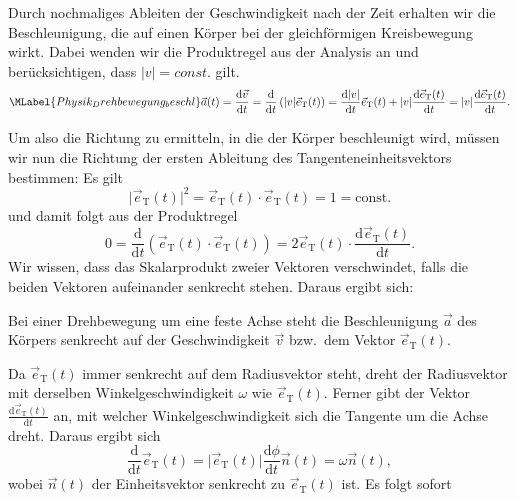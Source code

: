\begin{MExtra}
  
  Durch nochmaliges Ableiten der Geschwindigkeit nach der Zeit erhalten wir die Beschleunigung, die auf einen K\"orper bei der gleichf\"ormigen Kreisbewegung wirkt. Dabei wenden wir die Produktregel aus der Analysis an und ber\"ucksichtigen, dass $\vert v\vert=const.$ gilt.
  \begin{equation}\MLabel{Physik_Drehbewegung_beschl}
  \vec{a}(t)=\frac{\textrm{d}\vec{v}}{\textrm{d}t}=\frac{\textrm{d}}{\textrm{d}t}\left(\vert v\vert\vec{e}_{\textrm{T}}(t)\right)=\frac{\textrm{d}\vert v\vert}{\textrm{d}t}\vec{e}_{\textrm{T}}(t)+\vert v\vert\frac{\textrm{d}\vec{e}_{\textrm{T}}(t)}{\textrm{d}t}=\vert v\vert\frac{\textrm{d}\vec{e}_{\textrm{T}}(t)}{\textrm{d}t}.
  \end{equation} 
  
  
  Um also die Richtung zu ermitteln, in die der K\"orper beschleunigt wird, m\"ussen wir nun die Richtung der ersten Ableitung des Tangenteneinheitsvektors bestimmen: Es gilt
  $$
  \vert \vec{e}_{\textrm{T}}(t)\vert^2=\vec{e}_{\textrm{T}}(t)\cdot \vec{e}_{\textrm{T}}(t)= 1=\textrm{const.}
  $$ und damit folgt aus der Produktregel
  \begin{equation}
  0=\frac{\textrm{d}}{\textrm{d}t}\left(\vec{e}_{\textrm{T}}(t)\cdot \vec{e}_{\textrm{T}}(t)\right)=2 \vec{e}_{\textrm{T}}(t)\cdot\frac{\textrm{d}\vec{e}_{\textrm{T}}(t)}{\textrm{d}t}.
  \end{equation} Wir wissen, dass das Skalarprodukt zweier Vektoren verschwindet, falls die beiden Vektoren aufeinander senkrecht stehen. Daraus ergibt sich:
  
  \begin{MInfo}
  Bei einer Drehbewegung um eine feste Achse steht die Beschleunigung $\vec{a}$ des K\"orpers senkrecht auf der Geschwindigkeit $\vec{v}$ bzw.~dem Vektor $\vec{e}_{\textrm{T}}(t)$. 
  \end{MInfo}
  
  Da $\vec{e}_{\textrm{T}}(t)$ immer senkrecht auf dem Radiusvektor steht, dreht der Radiusvektor mit derselben Winkelgeschwindigkeit $\omega$ wie  $\vec{e}_{\textrm{T}}(t)$. Ferner gibt der Vektor $\frac{\textrm{d}\vec{e}_{\textrm{T}}(t)}{\textrm{d}t}$ an, mit welcher Winkelgeschwindigkeit sich die Tangente um die Achse dreht. Daraus ergibt sich
  \begin{equation}
  \frac{\textrm{d}}{\textrm{d}t}\vec{e}_{\textrm{T}}(t)=\vert\vec{e}_{\textrm{T}}(t)\vert \frac{\textrm{d}\phi}{\textrm{d}t}\vec{n}(t)=\omega\vec{n}(t),
  \end{equation}wobei $\vec{n}(t)$ der Einheitsvektor senkrecht zu $\vec{e}_{\textrm{T}}(t)$ ist. Es folgt sofort
  

\end{MExtra}
